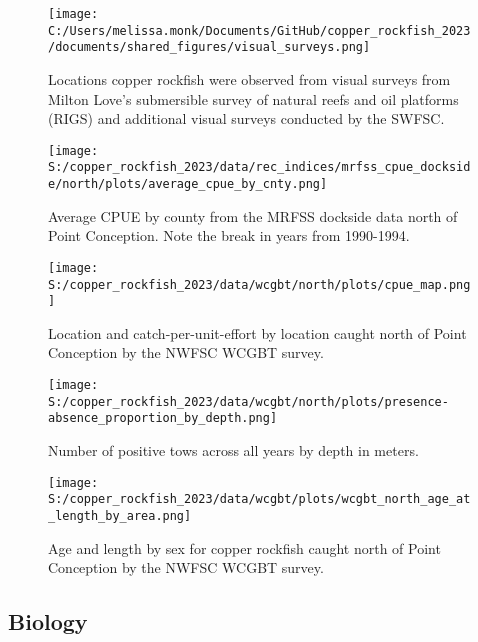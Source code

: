 \documentclass[11pt,
  english,
  letterpaper,
]{article}
\begin{document}
\pagebreak

\begin{figure}
\centering
\texttt{[image: C:/Users/melissa.monk/Documents/GitHub/copper\_rockfish\_2023/documents/shared\_figures/visual\_surveys.png]}
\caption{Locations copper rockfish were observed from visual surveys from Milton Love's submersible survey of natural reefs and oil platforms (RIGS) and additional visual surveys conducted by the SWFSC.\label{fig:visual-surveys}}
\end{figure}

\begin{figure}
\centering
\texttt{[image: S:/copper\_rockfish\_2023/data/rec\_indices/mrfss\_cpue\_dockside/north/plots/average\_cpue\_by\_cnty.png]}
\caption{Average CPUE by county from the MRFSS dockside data north of Point Conception. Note the break in years from 1990-1994.\label{fig:mrfss-cpue-county}}
\end{figure}

\begin{figure}
\centering
\texttt{[image: S:/copper\_rockfish\_2023/data/wcgbt/north/plots/cpue\_map.png]}
\caption{Location and catch-per-unit-effort by location caught north of Point Conception by the NWFSC WCGBT survey.\label{fig:wcgbt-cpue}}
\end{figure}

\pagebreak

\begin{figure}
\centering
\texttt{[image: S:/copper\_rockfish\_2023/data/wcgbt/north/plots/presence-absence\_proportion\_by\_depth.png]}
\caption{Number of positive tows across all years by depth in meters.\label{fig:wcgbt-depth}}
\end{figure}

\pagebreak

\begin{figure}
\centering
\texttt{[image: S:/copper\_rockfish\_2023/data/wcgbt/plots/wcgbt\_north\_age\_at\_length\_by\_area.png]}
\caption{Age and length by sex for copper rockfish caught north of Point Conception by the NWFSC WCGBT survey.\label{fig:wcgbt-len-age}}
\end{figure}

\pagebreak

\hypertarget{biology}{%
\subsection{Biology}\label{biology}}
\end{document}
